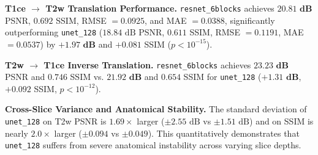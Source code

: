 \documentclass[10pt,twocolumn,letterpaper]{article}
\begin{document}
\begin{table}[tb]
\centering
\small
\caption{\textbf{Quantitative Test Set Evaluation (Mean $\pm$ Std).} Evaluated on 360 paired slices across all 4 held-out test subjects (\texttt{00025}, \texttt{00026}, \texttt{00028}, \texttt{00030}).}
\label{tab:quantitative}
\end{table}

\textbf{T1ce $\to$ T2w Translation Performance.} \texttt{resnet\_6blocks} achieves $\mathbf{20.81\text{ dB}}$ PSNR, $\mathbf{0.692}$ SSIM, RMSE $=0.0925$, and MAE $=0.0388$, significantly outperforming \texttt{unet\_128} ($18.84\text{ dB}$ PSNR, $0.611$ SSIM, RMSE $=0.1191$, MAE $=0.0537$) by $\mathbf{+1.97\text{ dB}}$ and $\mathbf{+0.081}$ SSIM ($p < 10^{-15}$).

\textbf{T2w $\to$ T1ce Inverse Translation.} \texttt{resnet\_6blocks} achieves $\mathbf{23.23\text{ dB}}$ PSNR and $\mathbf{0.746}$ SSIM vs. $\mathbf{21.92\text{ dB}}$ and $\mathbf{0.654}$ SSIM for \texttt{unet\_128} ($\mathbf{+1.31\text{ dB}}$, $\mathbf{+0.092}$ SSIM, $p < 10^{-12}$).

\textbf{Cross-Slice Variance and Anatomical Stability.} The standard deviation of \texttt{unet\_128} on T2w PSNR is $1.69\times$ larger ($\pm 2.55\text{ dB}$ vs $\pm 1.51\text{ dB}$) and on SSIM is nearly $2.0\times$ larger ($\pm 0.094$ vs $\pm 0.049$). This quantitatively demonstrates that \texttt{unet\_128} suffers from severe anatomical instability across varying slice depths.
\end{document}
